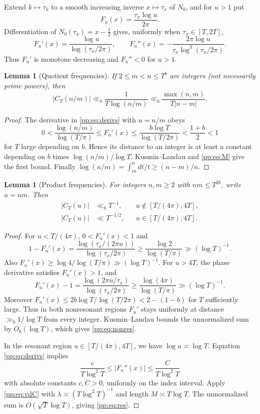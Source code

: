 \documentclass[11pt,reqno]{amsart}
\numberwithin{equation}{section}
\newtheorem{lemma}[theorem]{Lemma}
\begin{document}
Extend $k\mapsto\tau_k$ to a smooth increasing inverse $x\mapsto\tau_x$ of $N_0$, and for $u>1$ put
\begin{equation}
F_u(x)=\frac{\tau_x\log u}{2\pi}.
\label{pp:eq:F}
\end{equation}
Differentiation of $N_0(\tau_x)=x-\tfrac12$ gives, uniformly when $\tau_x\in[T,2T]$,
\begin{equation}
F_u'(x)=\frac{\log u}{\log(\tau_x/2\pi)},\qquad
F_u''(x)=-\frac{2\pi\log u}{\tau_x\log^3(\tau_x/2\pi)}.
\label{pp:eq:derivs}
\end{equation}
Thus $F_u'$ is monotone decreasing and $F_u''<0$ for $u>1$.

\begin{lemma}[Quotient frequencies]\label{pp:lem:quotient}
If $2\le m<n\le T^b$ are integers (not necessarily prime powers), then
\begin{equation}
|C_T(n/m)|\ll_b\frac{1}{T\log(n/m)}
\ll_b\frac{\max(n,m)}{T|n-m|}.
\label{pp:eq:quotient}
\end{equation}
\end{lemma}
\begin{proof}
The derivative in \eqref{pp:eq:derivs} with $u=n/m$ obeys
\[
0<\frac{\log(n/m)}{\log(T/\pi)}\le F_u'(x)
\le \frac{b\log T}{\log(T/2\pi)}<\frac{1+b}{2}<1
\]
for $T$ large depending on $b$. Hence its distance to an integer is at least a constant depending on $b$ times $\log(n/m)/\log T$. Kusmin--Landau and \eqref{pp:eq:M} give the first bound. Finally
$\log(n/m)=\int_m^n dt/t\ge(n-m)/n$.
\end{proof}

\begin{lemma}[Product frequencies]\label{pp:lem:product}
For integers $n,m\ge2$ with $nm\le T^{2b}$, write $u=nm$. Then
\begin{align}
|C_T(u)|&\ll_b T^{-1},&&u\notin[T/(4\pi),4T],\label{pp:eq:nonres}\\
|C_T(u)|&\ll T^{-1/2},&&u\in[T/(4\pi),4T].\label{pp:eq:res}
\end{align}
\end{lemma}
\begin{proof}
For $u<T/(4\pi)$, $0<F_u'(x)<1$ and
\[
1-F_u'(x)
=\frac{\log(\tau_x/(2\pi u))}{\log(\tau_x/2\pi)}
\ge\frac{\log2}{\log(T/\pi)}\gg(\log T)^{-1}.
\]
Also $F_u'(x)\ge\log4/\log(T/\pi)\gg(\log T)^{-1}$.
For $u>4T$, the phase derivative satisfies $F_u'(x)>1$, and\[
 F_u'(x)-1=\frac{\log(2\pi u/\tau_x)}{\log(\tau_x/2\pi)}
\ge\frac{\log(4\pi)}{\log(T/\pi)}\gg(\log T)^{-1}.
\]
Moreover $F_u'(x)\le 2b\log T/\log(T/2\pi)<2-(1-b)$ for $T$ sufficiently large. Thus in both nonresonant regions $F_u'$ stays uniformly at distance $\gg_b1/\log T$ from every integer. Kusmin--Landau bounds the unnormalized sum by $O_b(\log T)$, which gives \eqref{pp:eq:nonres}.

In the resonant region $u\in[T/(4\pi),4T]$, we have $\log u\asymp\log T$. Equation \eqref{pp:eq:derivs} implies
\[
\frac{c}{T\log^2T}\le|F_u''(x)|\le\frac{C}{T\log^2T}
\]
with absolute constants $c,C>0$, uniformly on the index interval. Apply \eqref{pp:eq:vdC} with $\lambda\asymp(T\log^2T)^{-1}$ and length $M\asymp T\log T$. The unnormalized sum is $O(\sqrt T\log T)$, giving \eqref{pp:eq:res}.
\end{proof}
\end{document}
